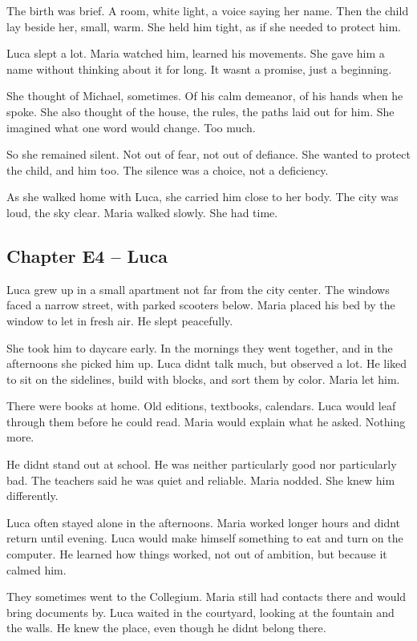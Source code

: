 \documentclass[
]{article}
\begin{document}
The birth was brief. A room, white light, a voice saying her name. Then the child lay beside her, small, warm. She held him tight, as if she needed to protect him.

Luca slept a lot. Maria watched him, learned his movements. She gave him a name without thinking about it for long. It wasn\textquotesingle t a promise, just a beginning.

She thought of Michael, sometimes. Of his calm demeanor, of his hands when he spoke. She also thought of the house, the rules, the paths laid out for him. She imagined what one word would change. Too much.

So she remained silent. Not out of fear, not out of defiance. She wanted to protect the child, and him too. The silence was a choice, not a deficiency.

As she walked home with Luca, she carried him close to her body. The city was loud, the sky clear. Maria walked slowly. She had time.

\subsection{Chapter E4 -- Luca}\label{chapter-e4-luca}

Luca grew up in a small apartment not far from the city center. The windows faced a narrow street, with parked scooters below. Maria placed his bed by the window to let in fresh air. He slept peacefully.

She took him to daycare early. In the mornings they went together, and in the afternoons she picked him up. Luca didn\textquotesingle t talk much, but observed a lot. He liked to sit on the sidelines, build with blocks, and sort them by color. Maria let him.

There were books at home. Old editions, textbooks, calendars. Luca would leaf through them before he could read. Maria would explain what he asked. Nothing more.

He didn\textquotesingle t stand out at school. He was neither particularly good nor particularly bad. The teachers said he was quiet and reliable. Maria nodded. She knew him differently.

Luca often stayed alone in the afternoons. Maria worked longer hours and didn\textquotesingle t return until evening. Luca would make himself something to eat and turn on the computer. He learned how things worked, not out of ambition, but because it calmed him.

They sometimes went to the Collegium. Maria still had contacts there and would bring documents by. Luca waited in the courtyard, looking at the fountain and the walls. He knew the place, even though he didn\textquotesingle t belong there.
\end{document}
